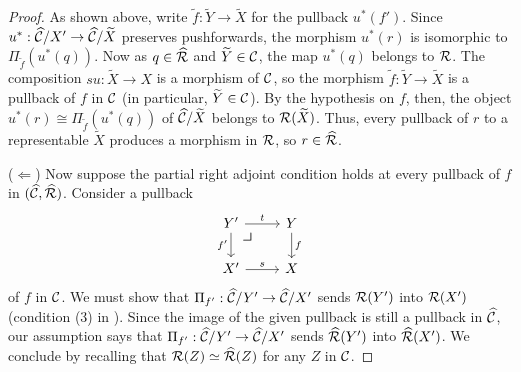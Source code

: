 \begin{proof}
  As shown above, write $\widetilde f : \widetilde Y \to \widetilde X$
  for the pullback $u^*(f')$.
  Since $u^* : \widehat{\mathcal{C}} / X' \to \widehat{\mathcal{C}} / \widetilde X$ preserves pushforwards,
  the morphism $u^*(r)$ is isomorphic to $\Pi_{\tilde f}(u^*(q))$.
  Now as $q \in \widehat{\mathcal{R}}$ and $\widetilde Y \in \mathcal{C}$,
  the map $u^*(q)$ belongs to $\mathcal{R}$.
  The composition $su : \widetilde X \to X$ is a morphism of $\mathcal{C}$,
  so the morphism $\widetilde f : \widetilde Y \to \widetilde X$
  is a pullback of $f$ in $\mathcal{C}$ (in particular, $\widetilde Y \in \mathcal{C}$).
  By the hypothesis on $f$, then,
  the object $u^*(r) \cong \Pi_{\tilde f}(u^*(q))$ of $\widehat{\mathcal{C}}/\widetilde X$
  belongs to $\mathcal{R}(\widetilde X)$.
  Thus, every pullback of $r$ to a representable $\widetilde X$
  produces a morphism in $\mathcal{R}$, so $r \in \widehat{\mathcal{R}}$.
  
  ($\Leftarrow$)
  Now suppose the partial right adjoint condition
  holds at every pullback of $f$ in $(\widehat{\mathcal{C}},\widehat{\mathcal{R}})$.
  Consider a pullback
  \[
    \begin{tikzcd}
      Y' \ar[r, "t"] \ar[d, "f'"'] \pbcorner & Y \ar[d, "f"] \\
      X' \ar[r, "s"] & X
    \end{tikzcd}
  \]
  of $f$ in $\mathcal{C}$.
  We must show that $\Pi_{f'} : \widehat{\mathcal{C}} / Y' \to \widehat{\mathcal{C}} / X'$
  sends $\mathcal{R}(Y')$ into $\mathcal{R}(X')$
  (condition (3) in ).
  Since the image of the given pullback
  is still a pullback in $\widehat{\mathcal{C}}$,
  our assumption says that $\Pi_{f'} : \widehat{\mathcal{C}} / Y' \to \widehat{\mathcal{C}} / X'$
  sends $\widehat{\mathcal{R}}(Y')$ into $\widehat{\mathcal{R}}(X')$.
  We conclude by recalling that
  $\mathcal{R}(Z) \simeq \widehat{\mathcal{R}}(Z)$ for any $Z$ in $\mathcal{C}$.
\end{proof}

